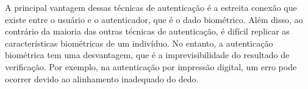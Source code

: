 A principal vantagem dessas técnicas de autenticação é a estreita conexão que
existe entre o usuário e o autenticador, que é o dado biométrico.
Além disso, ao contrário da maioria das outras técnicas de autenticação,
é difícil replicar as características biométricas de um indivíduo.
No entanto, a autenticação biométrica tem uma desvantagem, que é a
imprevisibilidade
do resultado de verificação.
Por exemplo, na autenticação por impressão digital, um erro pode ocorrer devido
ao alinhamento inadequado do dedo\cite{idrus2013}.